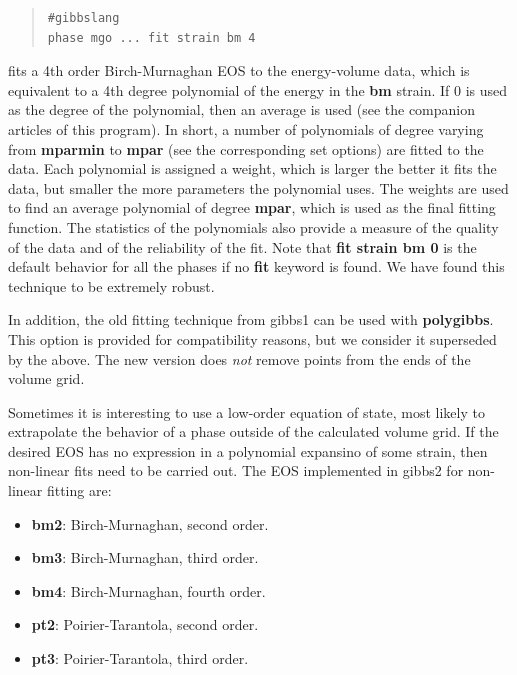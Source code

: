 \documentclass[a4paper]{article}
\begin{document}
\begin{itemize}
\begin{quote}
\begin{verbatim}
#gibbslang
phase mgo ... fit strain bm 4
\end{verbatim}
\end{quote}

fits a 4th order Birch-Murnaghan EOS to the energy-volume data,
which is equivalent to a 4th degree polynomial of the energy in the
\textbf{bm} strain. If 0 is used as the degree of the polynomial, then
an average is used (see the companion articles of this program). In
short, a number of polynomials of degree varying from \textbf{mparmin}
to \textbf{mpar} (see the corresponding set options) are fitted to the
data. Each polynomial is assigned a weight, which is larger the
better it fits the data, but smaller the more parameters the
polynomial uses. The weights are used to find an average polynomial
of degree \textbf{mpar}, which is used as the final fitting
function. The statistics of the polynomials also provide a measure
of the quality of the data and of the reliability of the fit. Note
that \textbf{fit strain bm 0} is the default behavior for all the phases
if no \textbf{fit} keyword is found. We have found this technique to be
extremely robust.

In addition, the old fitting technique from gibbs1 can be used with
\textbf{polygibbs}. This option is provided for compatibility reasons,
but we consider it superseded by the above. The new version does
\emph{not} remove points from the ends of the volume grid.

Sometimes it is interesting to use a low-order equation of state,
most likely to extrapolate the behavior of a phase outside of the
calculated volume grid. If the desired EOS has no expression in a
polynomial expansino of some strain, then non-linear fits need to
be carried out. The EOS implemented in gibbs2 for non-linear
fitting are:

\begin{itemize}
\item \textbf{bm2}: Birch-Murnaghan, second order.

\item \textbf{bm3}: Birch-Murnaghan, third order.

\item \textbf{bm4}: Birch-Murnaghan, fourth order.

\item \textbf{pt2}: Poirier-Tarantola, second order.

\item \textbf{pt3}: Poirier-Tarantola, third order.


\end{itemize}
\end{itemize}
\end{document}
